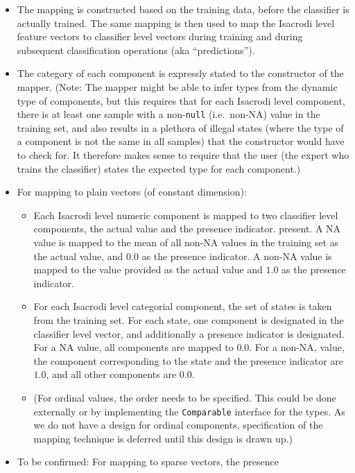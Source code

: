 \documentclass[a4paper,fleqn]{article}
\newcommand{\computercode}[1]{\texttt{#1}}
\begin{document}
\begin{itemize}
\item The mapping is constructed based on the training data, before
  the classifier is actually trained. The same mapping is then used to
  map the Isacrodi level feature vectors to classifier level vectors
  during training and during subsequent classification operations (aka
  ``predictions'').
\item The category of each component is expressly stated to the
  constructor of the mapper. (Note: The mapper might be able to infer
  types from the dynamic type of components, but this requires that
  for each Isacrodi level component, there is at least one sample with
  a non-\computercode{null} (i.e.\ non-NA) value in the training set,
  and also results in a plethora of illegal states (where the type of
  a component is not the same in all samples) that the constructor
  would have to check for. It therefore makes sense to require that
  the user (the expert who trains the classifier) states the expected
  type for each component.)
\item For mapping to plain vectors (of constant dimension):
  \begin{itemize}
  \item Each Isacrodi level numeric component is mapped to two
    classifier level components, the actual value and the presence
    indicator.  present. A NA value is mapped to the mean of all
    non-NA values in the training set as the actual value, and $0.0$
    as the presence indicator. A non-NA value is mapped to the value
    provided as the actual value and $1.0$ as the presence indicator.
  \item For each Isacrodi level categorial component, the set of
    states is taken from the training set. For each state, one
    component is designated in the classifier level vector, and
    additionally a presence indicator is designated. For a NA value,
    all components are mapped to $0.0$. For a non-NA, value, the
    component corresponding to the state and the presence indicator
    are $1.0$, and all other components are $0.0$.
  \item (For ordinal values, the order needs to be specified. This
    could be done externally or by implementing the
    \computercode{Comparable} interface for the types. As we do not
    have a design for ordinal components, specification of the mapping
    technique is deferred until this design is drawn up.)
  \end{itemize}
\item To be confirmed: For mapping to sparse vectors, the presence

\end{itemize}
\end{document}
